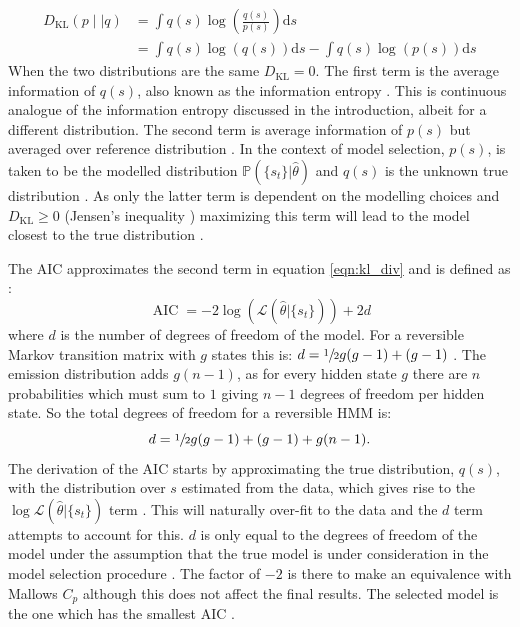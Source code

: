 \begin{equation}\label{eqn:kl_div}
\begin{split}
    D_{\mathrm{KL}}\left(p\mid | q\right) & = \int q(s) \log{\left(\frac{ q(s) }{p(s)}  \right)} \mathrm{d}s \\ 
    & = \int q(s) \log{\left(q(s)\right)}\mathrm{d}s - \int q(s)\log{\left(p(s)\right)} \mathrm{d}s
\end{split}
\end{equation}
When the two distributions are the same $D_{\mathrm{KL}} = 0$. The first term is the average information of $q(s)$, also known as the information entropy \cite{mackay2003information}. This is continuous analogue of the information entropy discussed in the introduction, albeit for a different distribution. The second term is average information of $p(s)$ but averaged over reference distribution \cite{mackay2003information}. In the context of model selection, $p(s)$, is taken to be the modelled distribution $\mathbb{P}(\{s_t\}|\hat{\theta})$ and $q(s)$ is the unknown true distribution \cite{mclachlanFiniteMixtureModels2000}. As only the latter term is dependent on the modelling choices and  $D_{\mathrm{KL}} \ge 0$ (Jensen's inequality \cite{mackay2003information}) maximizing this term will lead to the model closest to the true distribution \cite{mclachlanFiniteMixtureModels2000}.  

The AIC approximates the second term in equation \ref{eqn:kl_div} and is defined as \cite{akaikeInformationTheoryExtension1998}:
\begin{equation}\label{eqn:aic}
    \operatorname{AIC} = -2\log{\left(\mathcal{L}\left(\hat{\theta}|\{s_t\}\right)\right)} + 2d
\end{equation}
where $d$ is the number of degrees of freedom of the model. For a reversible Markov transition matrix with $g$ states this is: $d = \sfrac{1}{2}g(g-1) + (g-1)$ \cite{trendelkamp-schroerEstimationUncertaintyReversible2015b}. The emission distribution adds $g(n-1)$, as for every hidden state $g$ there are $n$ probabilities which must sum to $1$ \cite{noeProjectedHiddenMarkov2013a, rabinerTutorialHiddenMarkov1989} giving $n-1$ degrees of freedom per hidden state. So the total degrees of freedom for a reversible HMM is:
\begin{equation}\label{eqn:hmm_dof}
    d = \sfrac{1}{2}g(g-1) + (g-1) + g(n-1). 
\end{equation}
The derivation of the AIC starts by approximating the true distribution, $q(s)$, with the distribution over $s$ estimated from the data, which gives rise to the $\log{\mathcal{L}\left(\hat{\theta}|\{s_t\} \right)}$ term \cite{mclachlanFiniteMixtureModels2000}.  This will naturally over-fit to the data and the $d$ term attempts to account for this. $d$ is only equal to the degrees of freedom of the model under the assumption that the true model is under consideration in the model selection procedure \cite{ripley_1996}.  The factor of $-2$ is there to make an equivalence with Mallows $C_p$ \cite{friedman2001elements} although this does not affect the final results. The selected model is the one which has the smallest AIC \cite{friedman2001elements}. 

